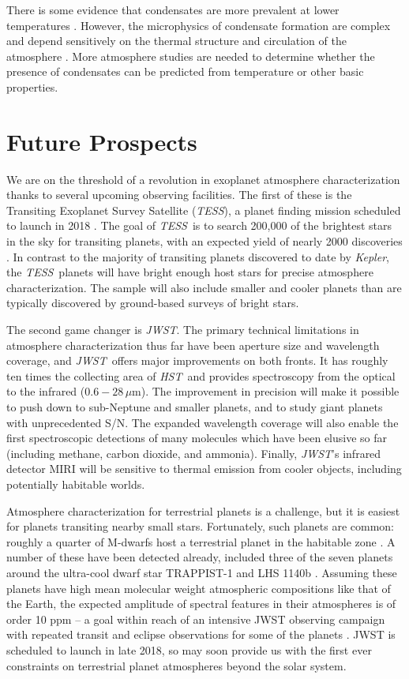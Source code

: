 \documentclass[graybox,natbib,nosecnum]{svmult}
\newcommand{\project}[1]{\textsl{#1}}
\newcommand{\JWST}{\project{JWST}}
\newcommand{\HST}{\project{HST}}
\newcommand{\TESS}{\project{TESS}}
\newcommand{\Kepler}{\project{Kepler}}
\begin{document}
There is some evidence that condensates are more prevalent at lower temperatures \citep{stevenson16, heng16}. However, the microphysics of condensate formation are complex and depend sensitively on the thermal structure and circulation of the atmosphere \citep{turco79}. More atmosphere studies are needed to determine whether the presence of condensates can be predicted from temperature or other basic properties.

\section{Future Prospects}
We are on the threshold of a revolution in exoplanet atmosphere characterization thanks to several upcoming observing facilities.  The first of these is the Transiting Exoplanet Survey Satellite (\TESS), a planet finding mission scheduled to launch in 2018 \citep{ricker14}.  The goal of \TESS\ is to search 200,000 of the brightest stars in the sky for transiting planets, with an expected yield of nearly 2000 discoveries \citep{sullivan15}. In contrast to the majority of transiting planets discovered to date by \Kepler, the \TESS\ planets will have bright enough host stars for precise atmosphere characterization. The sample will also include smaller and cooler planets than are typically discovered by ground-based surveys of bright stars. 

The second game changer is \JWST. The primary technical limitations in atmosphere characterization thus far have been aperture size and wavelength coverage, and \JWST\ offers major improvements on both fronts. It has roughly ten times the collecting area of \HST\, and provides spectroscopy from the optical to the infrared ($0.6 - 28\,\mu$m). The improvement in precision will make it possible to push down to sub-Neptune and smaller planets, and to study giant planets with unprecedented S/N. The expanded wavelength coverage will also enable the first spectroscopic detections of many molecules which have been elusive so far (including methane, carbon dioxide, and ammonia). Finally, \JWST's infrared detector MIRI will be sensitive to thermal emission from cooler objects, including potentially habitable worlds.

Atmosphere characterization for terrestrial planets is a challenge, but it is easiest for planets transiting nearby small stars.  Fortunately, such planets are common: roughly a quarter of M-dwarfs host a terrestrial planet in the habitable zone \citep{dressing15}. A number of these have been detected already, included three of the seven planets around the ultra-cool dwarf star TRAPPIST-1 and LHS 1140b \citep{gillon17, dittmann17}. Assuming these planets have high mean molecular weight atmospheric compositions like that of the Earth, the expected amplitude of spectral features in their atmospheres is of order 10 ppm -- a goal within reach of an intensive JWST observing campaign with repeated transit and eclipse observations for some of the planets \citep{morley17b}.  JWST is scheduled to launch in late 2018, so may soon provide us with the first ever constraints on terrestrial planet atmospheres beyond the solar system. 
\end{document}
